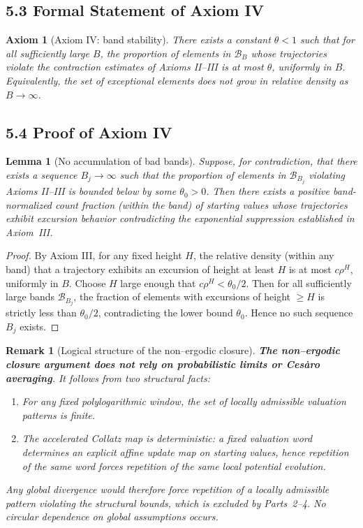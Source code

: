 \documentclass[preprint,12pt]{elsarticle}
\newtheorem{remark}{Remark}
\newtheorem{lemma}{Lemma}
\newtheorem{axiom}{Axiom}
\begin{document}
\subsection{5.3 Formal Statement of Axiom IV}
\begin{axiom}[Axiom IV: band stability]
There exists a constant $\theta<1$ such that for all sufficiently large $B$, the proportion of elements in $\mathcal{B}_B$ whose trajectories violate the contraction estimates of Axioms II–III is at most $\theta$, uniformly in $B$.
Equivalently, the set of exceptional elements does not grow in relative density as $B\to\infty$.
\end{axiom}

\subsection{5.4 Proof of Axiom IV}
\begin{lemma}[No accumulation of bad bands]
Suppose, for contradiction, that there exists a sequence $B_j\to\infty$ such that the proportion of elements in $\mathcal{B}_{B_j}$ violating Axioms II–III is bounded below by some $\theta_0>0$.
Then there exists a positive band-normalized count fraction (within the band) of starting values whose trajectories exhibit excursion behavior contradicting the exponential suppression established in Axiom~III.
\end{lemma}
\begin{proof}
By Axiom III, for any fixed height $H$, the relative density (within any band) that a trajectory exhibits an excursion of height at least $H$ is at most $c\rho^H$, uniformly in $B$.
Choose $H$ large enough that $c\rho^H < \theta_0/2$. Then for all sufficiently large bands $\mathcal{B}_{B_j}$, the fraction of elements with excursions of height $\ge H$ is strictly less than $\theta_0/2$, contradicting the lower bound $\theta_0$.
Hence no such sequence $B_j$ exists.
\end{proof}

\begin{remark}[Logical structure of the non--ergodic closure]
\label{rem:noncircular}
\textbf{The non--ergodic closure argument does not rely on probabilistic limits or
Ces\`aro averaging}. It follows from two structural facts:
\begin{enumerate}
\item For any fixed polylogarithmic window, the set of locally admissible valuation
patterns is finite.
\item The accelerated Collatz map is deterministic: a fixed valuation word determines an explicit affine update map on starting values, hence repetition of the same word forces repetition of the same local potential evolution.
\end{enumerate}
Any global divergence would therefore force repetition of a locally admissible
pattern violating the structural bounds, which is excluded by Parts~2--4.
No circular dependence on global assumptions occurs.
\end{remark}
\end{document}
